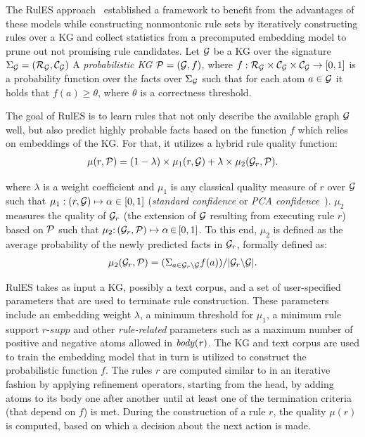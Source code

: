 The RulES approach~\cite{thinh2018} established a framework to benefit from the advantages of these models while constructing nonmontonic rule sets by iteratively constructing rules over a KG and collect statistics from a precomputed embedding model to prune out not promising rule candidates.
Let  $\mathcal{G}$ be a KG over the signature $\Sigma_{\mathcal{G}}=(\mathcal{R}_{\mathcal{G}},\mathcal{C}_{\mathcal{G}})$
A \emph{probabilistic KG} $\mathcal{P} = (\mathcal{G},f)$, 
where $f:\mathcal{R}_{\mathcal{G}}\times \mathcal{C}_{\mathcal{G}} \times \mathcal{C}_{\mathcal{G}}\rightarrow [0,1]$ is a probability function over the facts over $\Sigma_{\mathcal{G}}$ such that for each atom $a \in \mathcal{G} $ it holds that $f(a) \geq \theta $, where $\theta$ is a correctness threshold.

The goal of RulES is to learn rules that not only describe the available graph $\mathcal{G}$ well, but also predict highly probable facts based on the function $f$ which relies on embeddings of the KG. For that, it utilizes a hybrid rule quality function:
\begin{align*}
	\mu(r,\mathcal{P})= (1 - \lambda)\times \mu_1(r,\mathcal{G}) + \lambda \times \mu_2(\mathcal{G}_r,\mathcal{P}).
\end{align*}

where $\lambda$ is a weight coefficient and $\mu_1$ is any classical quality measure of $r$ over $\mathcal{G}$ such that $\mu_1: (r,\mathcal{G}) \mapsto \alpha \in  [0,1]$ (\eg \textit{standard confidence} or \textit{PCA confidence}~\cite{amie}). 
$\mu_2$ measures the quality of $\mathcal{G}_r$ (\ie the extension of $\mathcal{G}$ resulting from executing rule $r$) based on $\mathcal{P}$ such that
 $\mu_2{:}\, (\mathcal{G}_r,\mathcal{P}) \mapsto  \alpha \,{\in}\, [0,1]$. To this end, $\mu_2$ is defined as the average probability of the newly predicted facts in $\mathcal{G}_r$, formally defined as:
\begin{align*}
	\mu_2(\mathcal{G}_r,\mathcal{P}) = (\Sigma_{a\in \mathcal{G}_r\backslash \mathcal{G}} f(a)) /
				|\mathcal{G}_r \backslash \mathcal{G}|.
\end{align*}



RulES takes as input a KG, possibly a text corpus, and a set of user-specified parameters that are used to terminate rule construction.
These parameters include an embedding weight $\lambda$, 
a minimum threshold 
for $\mu_1$,  
a minimum rule support $\textit{r-supp}$ 
and other \emph{rule-related} parameters such as a maximum number of positive %
and negative 
atoms allowed in $\mathit{body(r)}$.
The KG and text corpus are used to train the embedding model that in turn is utilized to construct the probabilistic function $f$.
The rules $r$ are computed similar to \cite{amie} in an iterative fashion by applying refinement operators, starting from the head, by adding atoms to its body one after another until at least one of the termination criteria (that depend on $f$) is met. During the construction of a rule $r$, the quality $\mu(r)$ is computed, based on which a decision about the next action is made.

